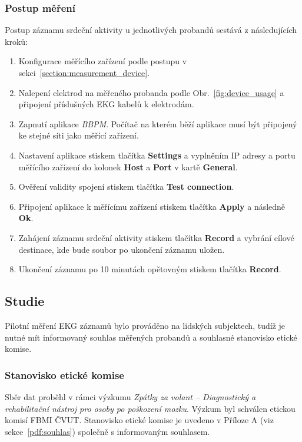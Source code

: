 \subsubsection{Postup měření}
\label{section:measurement_process}
Postup záznamu srdeční aktivity u jednotlivých probandů sestává z
následujících kroků:
\begin{enumerate}
    \item Konfigurace měřícího zařízení podle postupu v sekci~\ref{section:measurement_device}.
    \item Nalepení elektrod na měřeného probanda podle
          Obr.~\ref{fig:device_usage} a připojení příslušných EKG kabelů k elektrodám.
    \item Zapnutí aplikace \textit{BBPM}. Počítač na kterém běží aplikace musí
          být připojený ke stejné síti jako měřící zařízení.
    \item Nastavení aplikace stiskem tlačítka \textbf{Settings} a vyplněním IP
          adresy a portu měřícího zařízení do kolonek \textbf{Host} a \textbf{Port} v
          kartě \textbf{General}.
    \item Ověření validity spojení stiskem tlačítka \textbf{Test connection}.
    \item Připojení aplikace k měřícímu zařízení stiskem tlačítka
          \textbf{Apply} a následně \textbf{Ok}.
    \item Zahájení záznamu srdeční aktivity stiskem tlačítka \textbf{Record} a
          vybrání cílové destinace, kde bude soubor po ukončení záznamu uložen.
    \item Ukončení záznamu po 10 minutách opětovným stiskem tlačítka \textbf{Record}.
\end{enumerate}

\subsection{Studie}
\label{section:study}
Pilotní měření EKG záznamů bylo prováděno na lidských subjektech, tudíž je nutné
mít informovaný souhlas měřených probandů a souhlasné stanovisko etické komise.

\subsubsection{Stanovisko etické komise}
Sběr dat proběhl v rámci výzkumu \textit{Zpátky za volant -- Diagnostický a
rehabilitační nástroj pro osoby po poškození mozku}. Výzkum byl schválen etickou
komisí FBMI ČVUT. Stanovisko etické komise je uvedeno v Příloze
A (viz sekce~\ref{pdf:souhlas}) společně s informovaným souhlasem.


